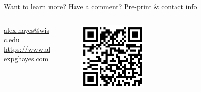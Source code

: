 \documentclass[final]{beamer}
\newlength{\sepwidth}
\newlength{\colwidth}
\newcommand{\separatorcolumn}{\begin{column}{\sepwidth}\end{column}}
\begin{document}
\begin{frame}[t]
\begin{columns}[t]
\begin{column}{\colwidth}
\begin{block}{Want to learn more? Have a comment? Pre-print \& contact info}
                \begin{columns}
                    \begin{column}{0.7\textwidth}
                        \begin{center}
                            \url{alex.hayes@wisc.edu} \\
                            \url{https://www.alexpghayes.com}
                        \end{center}
                    \end{column}
                    \begin{column}{0.3\textwidth}
                        \begin{figure}
                            \centering
                            \includegraphics[width=0.45\textwidth]{./figures/arxiv-qr.png}
                        \end{figure}
                    \end{column}
                \end{columns}
            \end{block}
        \end{column}
        \separatorcolumn
    \end{columns}
\end{frame}
\end{document}
